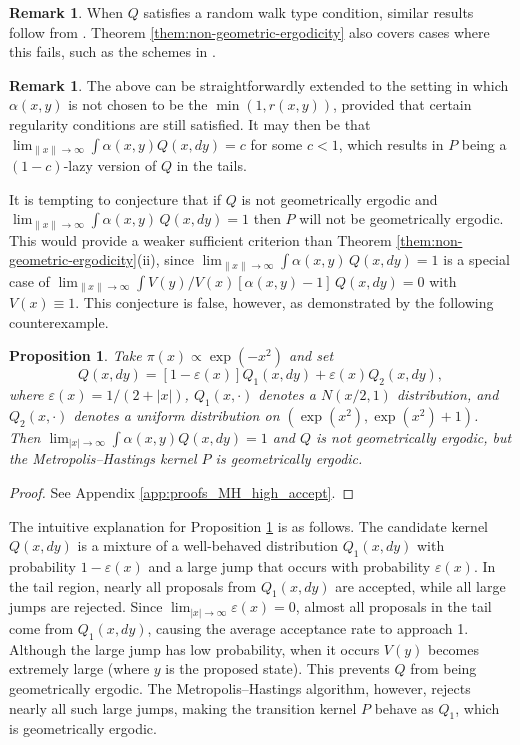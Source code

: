 \documentclass{article}
\theoremstyle{definition}
\newtheorem{remark}[definition]{Remark}
\theoremstyle{plain}
\newtheorem{proposition}[definition]{Proposition}
\begin{document}
\begin{remark}
    When $Q$ satisfies a random walk type condition, similar results follow from \cite{jarner2003necessary}. Theorem \ref{them:non-geometric-ergodicity} also covers cases where this fails, such as the schemes in \cite{livingstone2021geometric,girolami2011riemann,roberts2002langevin,xifara2014langevin}.
\end{remark}

\begin{remark} \label{rem:general_alpha}
    The above can be straightforwardly extended to the setting in which $\alpha(x,y)$ is not chosen to be the $\min(1, r(x,y))$, provided that certain regularity conditions are still satisfied.  It may then be that $\lim_{\|x\|\to\infty}\int \alpha(x,y)Q(x,dy)  = c$ for some $c < 1$, which results in $P$ being a $(1-c)$-lazy version of $Q$ in the tails.
\end{remark}

It is tempting to conjecture that if $Q$ is not geometrically ergodic and $\lim_{\|x\|\to\infty} \int \alpha(x,y)\,Q(x,dy) = 1$ then $P$ will not be geometrically ergodic. This would provide a weaker sufficient criterion than Theorem \ref{them:non-geometric-ergodicity}(ii), since $\lim_{\|x\|\to\infty} \int \alpha(x,y)\,Q(x,dy) = 1$ is a special case of $\lim_{\|x\|\to\infty} \int V(y)/V(x)[\alpha(x,y)-1]\,Q(x,dy) = 0$ with $V(x) \equiv 1$. This conjecture is false, however, as demonstrated by the following counterexample.

\begin{proposition}
\label{prop: counterexample}
    Take $\pi(x)\propto \exp(-x^2)$ and set
    $$
    Q(x,dy) = [1- \varepsilon(x)] Q_1(x,dy)+\varepsilon(x) Q_2(x,dy),
    $$
    where $\varepsilon(x) = 1/(2+|x|)$, $Q_1(x,\cdot)$ denotes a $N(x/2,1)$ distribution, and $Q_2(x,\cdot)$ denotes a uniform distribution on $(\exp(x^2),\exp(x^2)+1)$.  Then $\lim_{|x|\to\infty} \int \alpha(x,y) Q(x,dy) = 1$ and $Q$ is not geometrically ergodic, but the Metropolis--Hastings kernel $P$ \emph{is} geometrically ergodic.
\end{proposition}

\begin{proof}
See Appendix \ref{app:proofs_MH_high_accept}.
\end{proof}

The intuitive explanation for Proposition \ref{prop: counterexample} is as follows. The candidate kernel $Q(x,dy)$ is a mixture of a well-behaved distribution $Q_1(x,dy)$ with probability $1-\varepsilon(x)$ and a large jump that occurs with probability $\varepsilon(x)$. In the tail region, nearly all proposals from $Q_1(x,dy)$ are accepted, while all large jumps are rejected. Since $\lim_{|x|\to\infty} \varepsilon(x) = 0$, almost all proposals in the tail come from $Q_1(x,dy)$, causing the average acceptance rate to approach 1. Although the large jump has low probability, when it occurs $V(y)$ becomes extremely large (where $y$ is the proposed state). This prevents $Q$ from being geometrically ergodic. The Metropolis--Hastings algorithm, however, rejects nearly all such large jumps, making the transition kernel $P$ behave as $Q_1$, which is geometrically ergodic.
\end{document}
